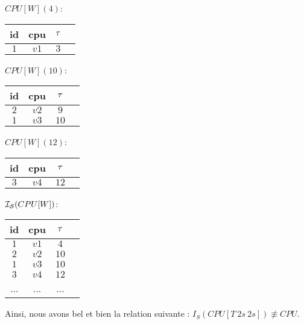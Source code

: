 \begin{example}
\noindent\begin{minipage}[c]{0.24\linewidth}
\begin{center}$CPU[W](4)$: \\ \vspace{1em}
\begin{tabular}{|c|c|c|c|}
\hline
id & cpu & $\tau$ \\
\hline
$1$ & $v1$ & $3$ \\
\hline
\end{tabular}\end{center}
\end{minipage}  %
\begin{minipage}[c]{0.24\linewidth}
\begin{center}$CPU[W](10)$: \\ \vspace{1em}
\begin{tabular}{|c|c|c|c|}
\hline
id & cpu & $\tau$ \\
\hline
$2$ & $v2$ & $9$ \\ \hline
$1$ & $v3$ & $10$ \\ \hline
\end{tabular}\end{center}
\end{minipage} %
\begin{minipage}[c]{0.24\linewidth}
\begin{center}$CPU[W](12)$: \\ \vspace{1em}
\begin{tabular}{|c|c|c|c|}
\hline
id & cpu & $\tau$ \\
\hline
$3$ & $v4$ & $12$ \\ \hline
\end{tabular}\end{center}
\end{minipage} %
\begin{minipage}[c]{0.24\linewidth}
\begin{center}$\mathcal{I_S}(CPU[W])$: \\ \vspace{1em}
\begin{tabular}{|c|c|c|c|} \hline
id & cpu & $\tau$ \\ \hline
$1$ & $v1$ & $4$ \\ \hline
$2$ & $v2$ & $10$ \\ \hline
$1$ & $v3$ & $10$ \\ \hline
$3$ & $v4$ & $12$ \\ \hline
... & ... & ... \\ \hline
\end{tabular}\end{center}
\end{minipage}

Ainsi, nous avons bel et bien la relation suivante : $I_S(CPU[T\ 2s\ 2s]) \not\equiv CPU$.
\end{example}

